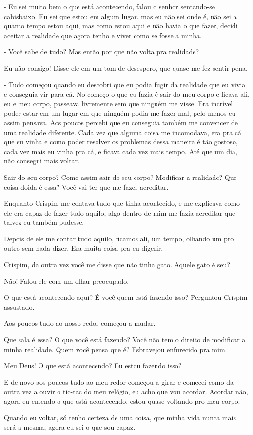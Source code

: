 - Eu sei muito bem o que está acontecendo, falou o senhor sentando-se cabisbaixo. Eu sei que estou em algum lugar, mas eu não sei onde é, não sei a quanto tempo estou aqui, mas como estou aqui e não havia o que fazer, decidi aceitar a realidade que agora tenho e viver como se fosse a minha.

- Você sabe de tudo? Mas então por que não volta pra realidade?

Eu não consigo! Disse ele em um tom de desespero, que quase me fez sentir pena.

- Tudo começou quando eu descobri que eu podia fugir da realidade que eu vivia e conseguia vir para cá. No começo o que eu fazia é sair do meu corpo e ficava ali, eu e meu corpo, passeava livremente sem que ninguém me visse. Era incrível poder estar em um lugar em que ninguém podia me fazer mal, pelo menos eu assim pensava. Aos poucos percebi que eu conseguia também me convencer de uma realidade diferente. Cada vez que alguma coisa me incomodava, era pra cá que eu vinha e como poder resolver os problemas dessa maneira é tão gostoso, cada vez mais eu vinha pra cá, e ficava cada vez mais tempo. Até que um dia, não consegui mais voltar.

Sair do seu corpo? Como assim sair do seu corpo? Modificar a realidade? Que coisa doida é essa? Você vai ter que me fazer acreditar.

Enquanto Crispim me contava tudo que tinha acontecido, e me explicava como ele era capaz de fazer tudo aquilo, algo dentro de mim me fazia acreditar que talvez eu também pudesse.

Depois de ele me contar tudo aquilo, ficamos ali, um tempo, olhando um pro outro sem nada dizer. Era muita coisa pra eu digerir.

Crispim, da outra vez você me disse que não tinha gato. Aquele gato é seu?

Não! Falou ele com um olhar preocupado.

O que está acontecendo aqui? É você quem está fazendo isso? Perguntou Crispim assustado.

Aos poucos tudo ao nosso redor começou a mudar.

Que sala é essa? O que você está fazendo? Você não tem o direito de modificar a minha realidade. Quem você pensa que é? Esbravejou enfurecido pra mim.

Meu Deus! O que está acontecendo? Eu estou fazendo isso?

E de novo aos poucos tudo ao meu redor começou a girar e comecei como da outra vez a ouvir o tic-tac do meu relógio, eu acho que vou acordar. Acordar não, agora eu entendo o que está acontecendo, estou quase voltando pro meu corpo.

Quando eu voltar, só tenho certeza de uma coisa, que minha vida nunca mais será a mesma, agora eu sei o que sou capaz.




